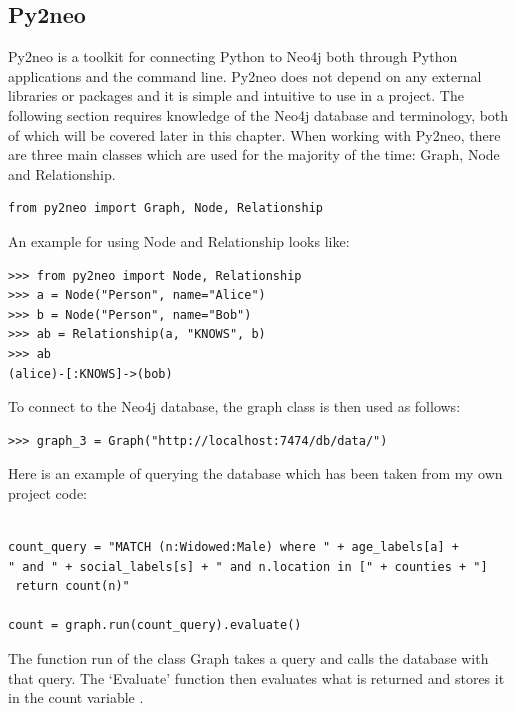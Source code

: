 \subsection{Py2neo}
Py2neo is a toolkit for connecting Python to Neo4j both through Python applications and the command line. Py2neo does not depend on any external libraries or packages and it is simple and intuitive to use in a project. The following section requires knowledge of the Neo4j database and terminology, both of which will be covered later in this chapter.
When working with Py2neo, there are three main classes which are used for the majority of the time: Graph, Node and Relationship.
\begin{verbatim}
from py2neo import Graph, Node, Relationship
\end{verbatim}
An example for using Node and Relationship looks like:
\begin{verbatim}
>>> from py2neo import Node, Relationship
>>> a = Node("Person", name="Alice")
>>> b = Node("Person", name="Bob")
>>> ab = Relationship(a, "KNOWS", b)
>>> ab
(alice)-[:KNOWS]->(bob)
\end{verbatim}
To connect to the Neo4j database, the graph class is then used as follows: 
\begin{verbatim}
>>> graph_3 = Graph("http://localhost:7474/db/data/")
\end{verbatim}
Here is an example of querying the database which has been taken from my own project code:
\begin{verbatim}

count_query = "MATCH (n:Widowed:Male) where " + age_labels[a] + 
" and " + social_labels[s] + " and n.location in [" + counties + "]
 return count(n)"

count = graph.run(count_query).evaluate()
\end{verbatim}
The function run of the class Graph takes a query and calls the database with that query. The ‘Evaluate’ function  then evaluates what is returned and stores it in the count variable \cite{py2neo}.
